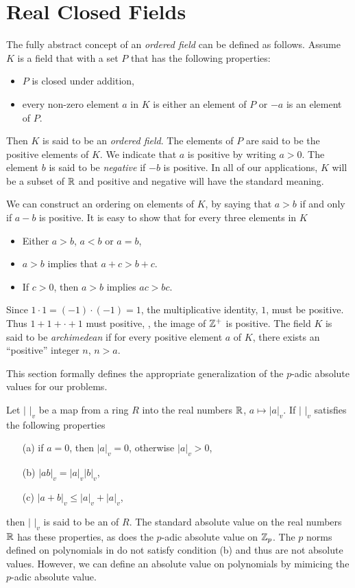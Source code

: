 \chapter{Real Closed Fields}
\label{Real:Chap}

The fully abstract concept of an {\em ordered field} can be defined as
follows.  Assume $K$ is a field that with a set $P$ that has the following
properties:
\begin{itemize}
\item $P$ is closed under addition,
\item every non-zero element $a$ in $K$ is either an element of $P$ or
$-a$ is an element of $P$.
\end{itemize}
Then $K$ is said to be an {\em ordered
field}.  The elements of $P$ are said to be
the positive elements of $K$. We indicate that
$a$ is positive by writing $a > 0$.  The element $b$ is said to be
{\em negative} if $-b$ is positive.  In all of our applications, $K$
will be a subset of $\mathbb{R}$ and positive and negative will have the
standard meaning.  

We can construct an ordering on elements of $K$, by
saying that $a > b$ if and only if $a - b$ is positive.  It is easy to
show that for every three elements in $K$ 
\begin{itemize}
\item Either $a> b$, $a < b$ or $a = b$, 
\item $a > b$ implies that $a + c > b + c$.
\item If $c> 0$, then $a>b$ implies $ac > bc$.
\end{itemize}

Since $1 \cdot 1 = (-1) \cdot (-1) = 1$, the multiplicative identity,
$1$, must be positive.  Thus $1 + 1 + \cdot + 1$ must positive, \ie,
the image of $\mathbb{Z}^{+}$ is positive.  The field $K$ is said to be {\em
archimedean} if for every positive element $a$ of $K$, there exists an
``positive'' integer $n$, $n > a$. 



This section formally defines the
appropriate generalization of the $p$-adic absolute values for our
problems.

Let $|\,\,|_v$ be a map from a ring $R$ into the real numbers $\mathbb{R}$,
$a \mapsto |a|_v$.  If $|\,\,|_v$ satisfies the following properties
\begin{itemize}
\item[(a)] if $a = 0$, then $|a|_v = 0$, otherwise $|a|_v > 0$,
\item[(b)] $|ab|_v = |a|_v |b|_v$,
\item[(c)] $|a + b|_v \le |a|_v + |a|_v$,
\end{itemize}
then $|\,\,|_v$ is said to be an  of $R$.  The
standard absolute value on the real numbers $\mathbb{R}$ has these properties,
as does the $p$-adic absolute value on $\mathbb{Z}_p$.  The $p$ norms defined
on polynomials in  do not satisfy condition (b)
and thus are not absolute values.  However, we can define an absolute
value on polynomials by mimicing the $p$-adic absolute value. 


